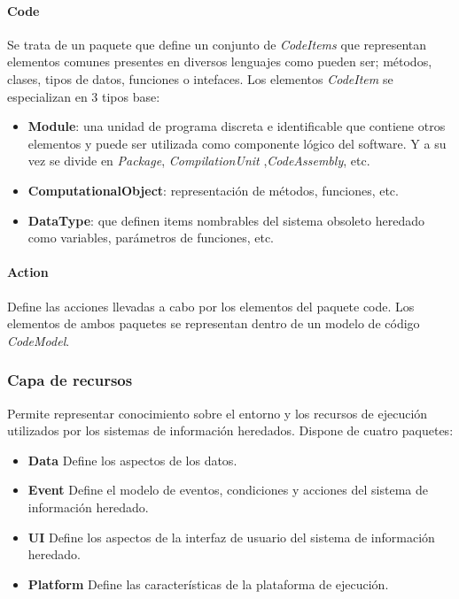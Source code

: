 {\paragraph{Code}
Se trata de un paquete que define un conjunto de \textit{CodeItems} que representan elementos comunes presentes en diversos lenguajes como pueden ser; métodos, clases, tipos de datos, funciones o intefaces.
Los elementos \textit{CodeItem} se especializan en 3 tipos base:
\begin{itemize}
 \item \textbf{Module}: una unidad de programa discreta e identificable que contiene otros elementos y puede ser utilizada como componente lógico del software. Y a su vez se divide en \textit{Package}, \textit{CompilationUnit}
 ,\textit{CodeAssembly}, etc. 
 \item \textbf{ComputationalObject}: representación de métodos, funciones, etc.
 \item \textbf{DataType}: que definen items nombrables del sistema obsoleto heredado como variables, parámetros de funciones, etc.
\end{itemize} 

\paragraph{Action}
Define las acciones llevadas a cabo por los elementos del paquete code. Los elementos de ambos paquetes se representan
dentro de un modelo de código \textit{CodeModel}.

\subsubsection{Capa de recursos}
Permite representar conocimiento sobre el entorno y los recursos de ejecución utilizados por los sistemas de información
heredados. Dispone de cuatro paquetes:
\begin{itemize}
\item \textbf{Data} Define los aspectos de los datos.
\item \textbf{Event} Define el modelo de eventos, condiciones y acciones del
sistema de información heredado.
\item \textbf{UI} Define los aspectos de la interfaz de usuario del sistema de
información heredado.
\item \textbf{Platform} Define las características de la plataforma de ejecución.
\end{itemize}

}
